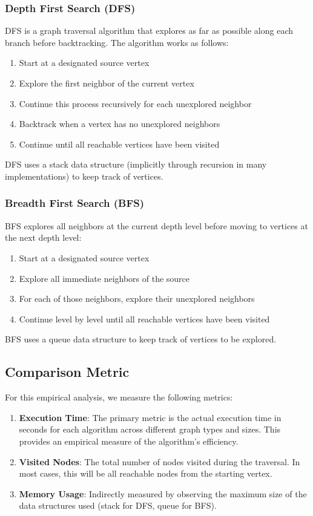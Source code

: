 \documentclass[a4paper,12pt]{article}
\begin{document}
\subsubsection{Depth First Search (DFS)}
\label{sec:orge877121}
DFS is a graph traversal algorithm that explores as far as possible along each branch before backtracking. The algorithm works as follows:
\begin{enumerate}
\item Start at a designated source vertex
\item Explore the first neighbor of the current vertex
\item Continue this process recursively for each unexplored neighbor
\item Backtrack when a vertex has no unexplored neighbors
\item Continue until all reachable vertices have been visited
\end{enumerate}

DFS uses a stack data structure (implicitly through recursion in many implementations) to keep track of vertices.
\subsubsection{Breadth First Search (BFS)}
\label{sec:orgd2fdb2a}
BFS explores all neighbors at the current depth level before moving to vertices at the next depth level:
\begin{enumerate}
\item Start at a designated source vertex
\item Explore all immediate neighbors of the source
\item For each of those neighbors, explore their unexplored neighbors
\item Continue level by level until all reachable vertices have been visited
\end{enumerate}

BFS uses a queue data structure to keep track of vertices to be explored.
\subsection{Comparison Metric}
\label{sec:org5b05c47}
For this empirical analysis, we measure the following metrics:

\begin{enumerate}
\item \textbf{\textbf{Execution Time}}: The primary metric is the actual execution time in seconds for each algorithm across different graph types and sizes. This provides an empirical measure of the algorithm's efficiency.

\item \textbf{\textbf{Visited Nodes}}: The total number of nodes visited during the traversal. In most cases, this will be all reachable nodes from the starting vertex.

\item \textbf{\textbf{Memory Usage}}: Indirectly measured by observing the maximum size of the data structures used (stack for DFS, queue for BFS).
\end{enumerate}
\end{document}
